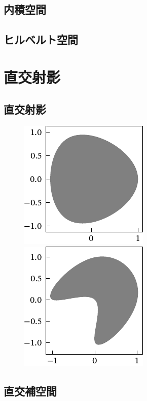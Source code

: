 \documentclass[../../main]{subfiles}
\begin{document}
\subsection{内積空間}
\subsection{ヒルベルト空間}

\section{直交射影}
\subsection{直交射影}

\begin{figure}[htbp]
  \begin{minipage}{\linewidth/2}
    \centering
    \includegraphics{convex.pdf}
  \end{minipage}%
  \begin{minipage}{\linewidth/2}
    \centering
    \includegraphics{non_convex.pdf}
  \end{minipage}
\end{figure}

\subsection{直交補空間}
\end{document}
